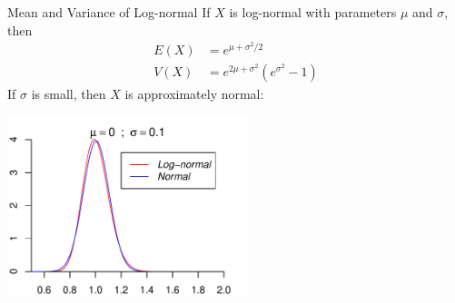 \documentclass[handout]{beamer}
\begin{document}
\begin{frame}{Mean and Variance of Log-normal}
If $X$ is log-normal with parameters $\mu$ and $\sigma$, then
\begin{align*}
E(X) &= e^{\mu+\sigma^2/2}\\
V(X) &= e^{2\mu+\sigma^2}(e^{\sigma^2}-1)
\end{align*}
If $\sigma$ is small, then $X$ is approximately normal:
\begin{center}
\includegraphics[width=7cm]{ch4_pdf_logn2.pdf}
\end{center}
\end{frame}



\end{document}
